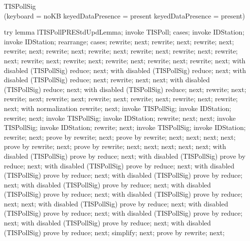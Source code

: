     TISPollSig \\
\implies (\IF keyboard = noKB
          \THEN \lnot keyedDataPresence = present
          \ELSE keyedDataPresence = present)


try lemma lTISPollPREStdUpdLemma;
invoke TISPoll;
cases;
invoke \Delta IDStation;
invoke IDStation;
rearrange;
cases;
rewrite;
next;
rewrite;
next;
rewrite;
next;
rewrite;
next;
rewrite;
next;
rewrite;
next;
rewrite;
next;
rewrite;
next;
rewrite;
next;
rewrite;
next;
rewrite;
next;
rewrite;
next;
rewrite;
next;
rewrite;
next;
with disabled (TISPollSig) reduce;
next;
with disabled (TISPollSig) reduce;
next;
with disabled (TISPollSig) reduce;
next;
rewrite;
next;
next;
with disabled (TISPollSig) reduce;
next;
with disabled (TISPollSig) reduce;
next;
rewrite;
next;
rewrite;
next;
rewrite;
next;
rewrite;
next;
rewrite;
next;
rewrite;
next;
rewrite;
next;
with normalization rewrite;
next;
invoke TISPollSig;
invoke IDStation;
rewrite;
next;
invoke TISPollSig;
invoke IDStation;
rewrite;
next;
next;
invoke TISPollSig;
invoke IDStation;
rewrite;
next;
invoke TISPollSig;
invoke IDStation;
rewrite;
next;
prove by rewrite;
next;
prove by rewrite;
next;
next;
next;
next;
prove by rewrite;
next;
prove by rewrite;
next;
next;
next;
next;
next;
with disabled (TISPollSig) prove by reduce;
next;
with disabled (TISPollSig) prove by reduce;
next;
with disabled (TISPollSig) prove by reduce;
next;
with disabled (TISPollSig) prove by reduce;
next;
with disabled (TISPollSig) prove by reduce;
next;
with disabled (TISPollSig) prove by reduce;
next;
with disabled (TISPollSig) prove by reduce;
next;
with disabled (TISPollSig) prove by reduce;
next;
next;
with disabled (TISPollSig) prove by reduce;
next;
with disabled (TISPollSig) prove by reduce;
next;
with disabled (TISPollSig) prove by reduce;
next;
with disabled (TISPollSig) prove by reduce;
next;
with disabled (TISPollSig) prove by reduce;
next;
simplify;
next;
prove by rewrite;
next;

